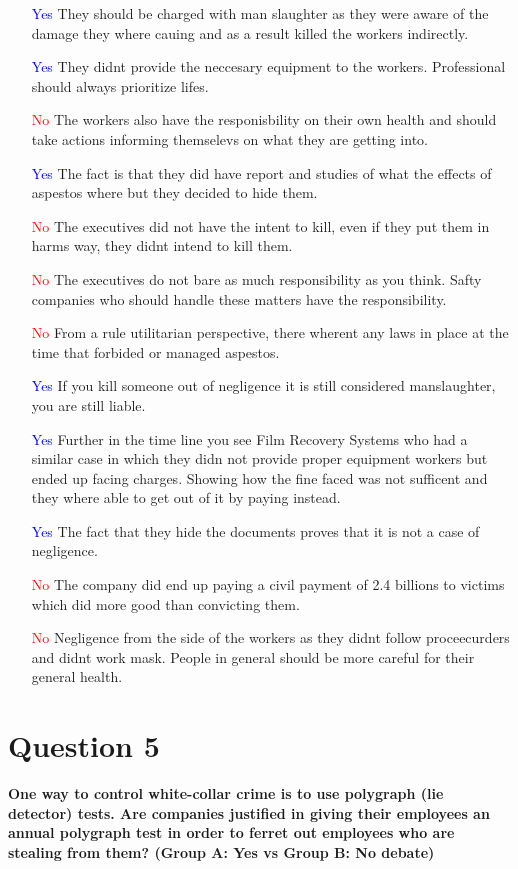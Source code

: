 \documentclass[12pt]{article}
\begin{document}
\begin{itemize}
    \item [\textcolor{blue}{Yes}] They should be charged with man slaughter as they were aware of the damage they where cauing and as a result killed the workers indirectly.
    \item [\textcolor{blue}{Yes}] They didnt provide the neccesary equipment to the workers. Professional should always prioritize lifes.
    \item [\textcolor{red}{No}] The workers also have the responisbility on their own health and should take actions informing themselevs on what they are getting into.
    \item [\textcolor{blue}{Yes}] The fact is that they did have report and studies of what the effects of aspestos where but they decided to hide them.
    \item [\textcolor{red}{No}] The executives did not have the intent to kill, even if they put them in harms way, they didnt intend to kill them.
    \item [\textcolor{red}{No}] The executives do not bare as much responsibility as you think. Safty companies who should handle these matters have the responsibility.
    \item [\textcolor{red}{No}] From a rule utilitarian perspective, there wherent any laws in place at the time that forbided or managed aspestos.
    \item [\textcolor{blue}{Yes}] If you kill someone out of negligence it is still considered manslaughter, you are still liable.
    \item [\textcolor{blue}{Yes}] Further in the time line you see Film Recovery Systems who had a similar case in which they didn not provide proper equipment workers but ended up facing charges. Showing how the fine faced was not sufficent and they where able to get out of it by paying instead.
    \item [\textcolor{blue}{Yes}] The fact that they hide the documents proves that it is not a case of negligence.
    \item [\textcolor{red}{No}] The company did end up paying a civil payment of 2.4 billions to victims which did more good than convicting them.
    \item [\textcolor{red}{No}] Negligence from the side of the workers as they didnt follow proceecurders and didnt work mask. People in general should be more careful for their general health.
\end{itemize}
\section*{Question 5}
\textbf{One way to control white-collar crime is to use polygraph (lie detector) tests. Are companies justified in giving their employees an annual polygraph test in order to ferret out employees who are stealing from them? (Group A: Yes vs Group B: No debate)}
\end{document}
